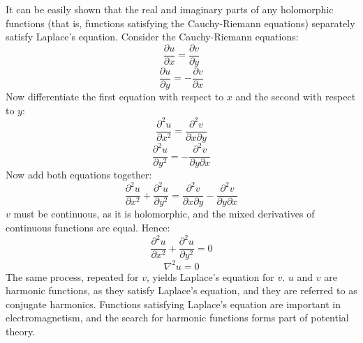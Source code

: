 \documentclass[12pt]{article}
\begin{document}
It can be easily shown that the real and imaginary parts of any holomorphic functions (that is, functions satisfying the Cauchy-Riemann equations) separately satisfy Laplace's equation. Consider the Cauchy-Riemann equations:
\[
\frac{\partial u}{\partial x} = \frac{\partial v}{\partial y}
\]
\[
\frac{\partial u}{\partial y} = -\frac{\partial v}{\partial x}
\]
Now differentiate the first equation with respect to $x$ and the second with respect to $y$:
\[
\frac{\partial^2 u}{\partial x^2} = \frac{\partial^2 v}{\partial x \partial y}
\]
\[
\frac{\partial^2 u}{\partial y^2} = -\frac{\partial^2 v}{\partial y \partial x}
\]
Now add both equations together:
\[
\frac{\partial^2 u}{\partial x^2} + \frac{\partial^2 u}{\partial y^2} = \frac{\partial^2 v}{\partial x \partial y}-\frac{\partial^2 v}{\partial y \partial x}
\]
$v$ must be continuous, as it is holomorphic, and the mixed derivatives of continuous functions are equal. Hence:
\[
\frac{\partial^2 u}{\partial x^2} + \frac{\partial^2 u}{\partial y^2} = 0
\]
\[
\nabla^2 u = 0
\]
The same process, repeated for $v$, yields Laplace's equation for $v$. $u$ and $v$ are harmonic functions, as they satisfy Laplace's equation, and they are referred to as conjugate harmonics. Functions satisfying Laplace's equation are important in electromagnetism, and the search for harmonic functions forms part of potential theory.
\end{document}
